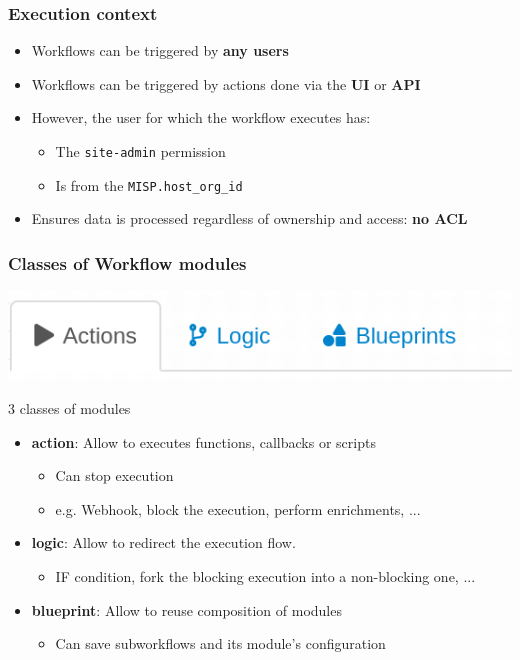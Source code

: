 \begin{frame}
    \frametitle{Execution context}
    \begin{itemize}
        \item Workflows can be triggered by \textbf{any users}
        \item Workflows can be triggered by actions done via the \textbf{UI} or \textbf{API}
        \item However, the user for which the workflow executes has:
        \begin{itemize}
            \item The \texttt{site-admin} permission
            \item Is from the \texttt{MISP.host\_org\_id}
        \end{itemize}
        \item Ensures data is processed regardless of ownership and access: \textbf{no ACL}
    \end{itemize}
\end{frame}

\begin{frame}
    \frametitle{Classes of Workflow modules}
    \begin{center}
        \includegraphics[width=0.6\linewidth]{pictures/module-type.png}
    \end{center}
    3 classes of modules
    \begin{itemize}
        \item \textbf{action}: Allow to executes functions, callbacks or scripts
        \begin{itemize}
            \item Can stop execution
            \item e.g. Webhook, block the execution, perform enrichments, ...
        \end{itemize}
        \item \textbf{logic}: Allow to redirect the execution flow.
        \begin{itemize}
            \item IF condition, fork the blocking execution into a non-blocking one, ...
        \end{itemize}
        \item \textbf{blueprint}: Allow to reuse composition of modules
        \begin{itemize}
            \item Can save subworkflows and its module's configuration
        \end{itemize}
    \end{itemize}
\end{frame}

